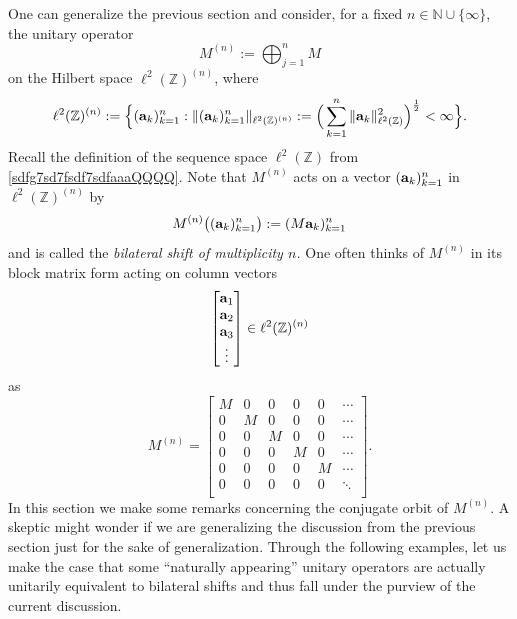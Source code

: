\documentclass{dis}
\theoremstyle{plain}
\theoremstyle{definition}
\def\N{\mathbb{N}}
\def\Z{\mathbb{Z}}
\renewcommand{\vec}[1]{{\bf #1}}
\newcommand{\0}{{\color{lightgray}0}}
\begin{document}
One can generalize the previous section and consider, for a fixed $n \in \N \cup \{\infty\}$, the unitary operator 
$$M^{(n)} := \bigoplus_{j = 1}^{n} M$$
on the Hilbert space  $\ell^{2}(\Z)^{(n)}$, where 
$$\ell^{2}(\Z)^{(n)} := \Big\{(\vec{a}_k)_{k = 1}^{n}: \|(\vec{a}_k)_{k = 1}^{n}\|_{\ell^2(\Z)^{(n)}} :=  \Big(\sum_{k = 1}^{n}\|\vec{a}_k\|^{2}_{\ell^2(\Z)}\Big)^{\frac{1}{2}} < \infty\Big\}.$$
Recall the definition of the sequence space $\ell^2(\Z)$ from \eqref{sdfg7sd7fsdf7sdfaaaQQQQ}.
 Note that $M^{(n)}$ acts on a vector $(\vec{a}_k)_{k = 1}^{n}$ in $\ell^{2}(\Z)^{(n)}$ by 
$$M^{(n)} \big((\vec{a}_k)_{k = 1}^{n} \big) := (M \vec{a}_k)_{k = 1}^{n}$$ and is called the {\em bilateral shift of multiplicity $n$.} 
One often thinks of $M^{(n)}$ in its block matrix form  acting on column vectors 
$$\begin{bmatrix}\vec{a}_1 \\ \vec{a}_2 \\ \vec{a}_{3} \\ \vdots\end{bmatrix} \in \ell^2(\Z)^{(n)}$$
as 
$$M^{(n)} = \begin{bmatrix} 
M & 0 & 0 & 0 & 0 & \cdots \\
0  & M & 0 & 0 & 0 & \cdots\\
0 & 0 & M & 0 & 0 & \cdots\\
0 & 0 & 0 & M & 0 & \cdots\\
0 & 0 & 0 & 0 & M & \cdots\\[-4pt]
0 & 0 & 0 & 0 & 0 & \ddots\\
\end{bmatrix}.$$
In this section we make some remarks concerning  the conjugate orbit of $M^{(n)}$. A skeptic might wonder if we are generalizing the discussion from the previous section just for the sake of generalization. Through the following examples, let us make the case that some ``naturally appearing'' unitary operators are actually unitarily equivalent to bilateral shifts and thus fall under the purview of the current discussion. 
\end{document}
